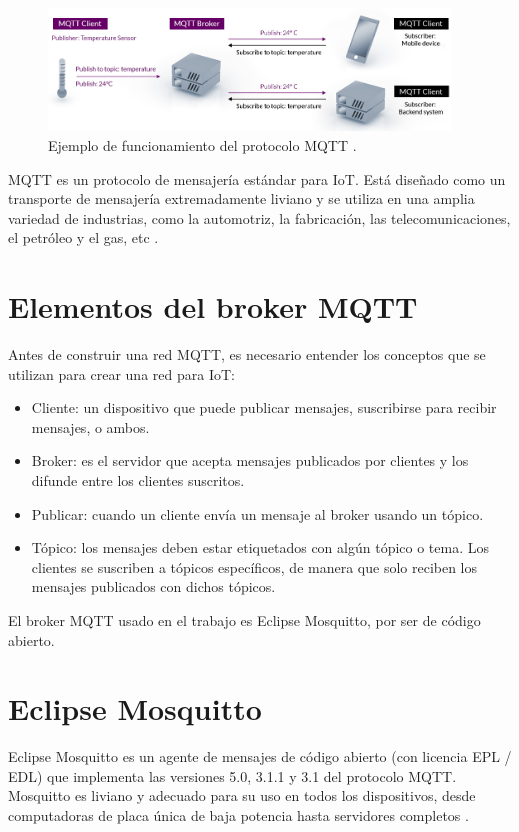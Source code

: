 \begin{itemize}
\vspace{0.5cm}

\begin{figure}[htbp]
	\centering
	\includegraphics[width=0.95\textwidth]{./Figures/mqtt.png}
	\caption{Ejemplo de funcionamiento del protocolo MQTT \protect\footnotemark.}
	\label{fig:mqtt}
\end{figure}



MQTT es un protocolo de mensajería estándar para IoT. Está diseñado como un transporte de mensajería extremadamente liviano y se utiliza en una amplia variedad de industrias, como la automotriz, la fabricación, las telecomunicaciones, el petróleo y el gas, etc \citep{WEBSITE:4}. 
\end{itemize}

\section{Elementos del broker MQTT}

Antes de construir una red MQTT, es necesario entender los conceptos que se utilizan para crear una red para IoT: 
\begin{itemize}
\item Cliente: un dispositivo que puede publicar mensajes, suscribirse para recibir mensajes, o ambos.
\item Broker: es el servidor que acepta mensajes publicados por clientes y los difunde entre los clientes suscritos.
\item Publicar: cuando un cliente envía un mensaje al broker usando un tópico.
\item Tópico: los mensajes deben estar etiquetados con algún tópico o tema. Los clientes se suscriben a tópicos específicos, de manera que solo reciben los mensajes publicados con dichos tópicos. 
\end{itemize}

El broker MQTT usado en el trabajo es Eclipse Mosquitto, por ser de código abierto.

\section{Eclipse Mosquitto} 
Eclipse Mosquitto es un agente de mensajes de código abierto (con licencia EPL / EDL) que implementa las versiones 5.0, 3.1.1 y 3.1 del protocolo MQTT. Mosquitto es liviano y adecuado para su uso en todos los dispositivos, desde computadoras de placa única de baja potencia hasta servidores completos \citep{WEBSITE:5}.

